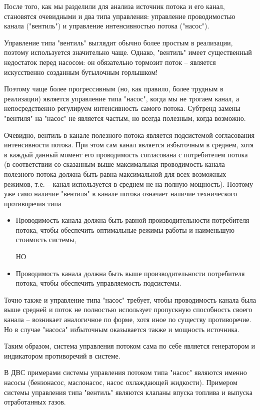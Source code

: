 \documentclass[a4paper,11pt]{article}
\begin{document}
После того, как мы разделили для анализа источник потока и его канал,
становятся очевидными и два типа управления: управление проводимостью канала
("вентиль") и управление интенсивностью потока ("насос").

Управление типа "вентиль" выглядит обычно более простым в реализации, поэтому
используется значительно чаще. Однако, "вентиль" имеет существенный недостаток
перед насосом: он обязательно тормозит поток -- является искусственно созданным
бутылочным горлышком!

Поэтому чаще более прогрессивным (но, как правило, более трудным в реализации)
является управление типа "насос", когда мы не трогаем канал, а непосредственно
регулируем интенсивность самого потока. Субтренд замены "вентиля" на "насос"
не является частым, но всегда полезным, когда возможно.

Очевидно, вентиль в канале полезного потока является подсистемой согласования
интенсивности потока. При этом сам канал является избыточным в среднем, хотя в
каждый данный момент его проводимость согласована с потребителем потока (в
соответствии со сказанным выше максимальная проводимость канала полезного
потока должна быть равна максимальной для всех возможных режимов, т.е. --
канал используется в среднем не на полную мощность). Поэтому уже само наличие
"вентиля" в канале потока означает наличие технического противоречия типа
\begin{itemize}
\item Проводимость канала должна быть равной производительности потребителя
  потока, чтобы обеспечить оптимальные режимы работы и наименьшую стоимость
  системы,

  НО

\item Проводимость канала должна быть выше производительности потребителя
  потока, чтобы обеспечить управляемость подсистемы.
\end{itemize}

Точно также и управление типа "насос" требует, чтобы проводимость канала была
выше средней и поток не полностью использует пропускную способность своего
канала -- возникает аналогичное по форме, хотя иное по существу противоречие.
Но в случае "насоса" избыточным оказывается также и мощность источника.

Таким образом, система управления потоком сама по себе является генератором и
индикатором противоречий в системе.

В ДВС примерами системы управления потоком типа "насос" являются именно насосы
(бензонасос, маслонасос, насос охлаждающей жидкости). Примером системы
управления типа "вентиль" являются клапаны впуска топлива и выпуска
отработанных газов.
\end{document}
